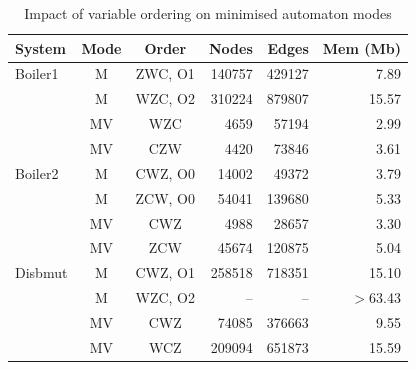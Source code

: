 \begin{table}
\begin{center}
\begin{tabular}{|l|c|c|r|r|r|}
\hline
\bf System & \bf Mode & \bf Order & \bf Nodes & \bf Edges & \bf Mem (Mb) \\
\hline
Boiler1    &     M    & ZWC, O1   & 140757    &  429127    &  7.89    \\
           &     M    & WZC, O2   & 310224    &  879807    & 15.57    \\
           &     MV   & WZC       &   4659    &   57194    &  2.99    \\
           &     MV   & CZW       &   4420    &   73846    &  3.61    \\ 
\hline
Boiler2    &     M    & CWZ, O0   &  14002    &   49372    &  3.79    \\
           &     M    & ZCW, O0   &  54041    &  139680    &  5.33    \\
           &     MV   & CWZ       &   4988    &   28657    &  3.30    \\
           &     MV   & ZCW       &  45674    &  120875    &  5.04    \\ 
\hline
Disbmut    &     M    & CWZ, O1   &  258518   &  718351    & 15.10    \\
           &     M    & WZC, O2   &    --     &    --      &$>$63.43  \\
           &     MV   & CWZ       &   74085   &  376663    &  9.55    \\
           &     MV   & WCZ       &  209094   &  651873    & 15.59    \\
\hline   
\end{tabular}
\end{center}
\caption{Impact of variable ordering on minimised automaton modes \label{tab:ord}}
\end{table}


